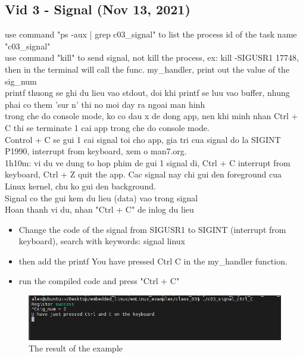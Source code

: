 \documentclass{article}
\begin{document}
\subsection{Vid 3 - Signal (Nov 13, 2021)}

use command "ps -aux | grep c03\_signal" to list the process id of the task name "c03\_signal"
\\use command "kill" to send signal, not kill the process, ex: kill -SIGUSR1 17748, then in the terminal will call the func. my\_handler, print out the value of the sig\_num
\\printf thuong se ghi du lieu vao stdout, doi khi printf se luu vao buffer, nhung phai co them 'sur n' thi no moi day ra ngoai man hinh 
\\trong che do console mode, ko co dau x de dong app, nen khi minh nhan Ctrl + C thi se terminate 1 cai app trong che do console mode.
\\Control + C se gui 1 cai signal toi cho app, gia tri cua signal do la SIGINT P1990, interrupt from keyboard, xem o man7.org.
\\1h10m: vi du ve dung to hop phim de gui 1 signal di, Ctrl + C interrupt from keyboard, Ctrl + Z quit the app. Cac signal nay chi gui den foreground cua Linux kernel, chu ko gui den background.
\\Signal co the gui kem du lieu (data) vao trong signal
\\Hoan thanh vi du, nhan "Ctrl + C" de inlog du lieu
\begin{itemize}
  \item Change the code of the signal from SIGUSR1 to SIGINT (interrupt from keyboard), search with keywords: signal linux
  \item then add the printf You have pressed Ctrl C in the my\_handler function.
  \item run the compiled code and press "Ctrl + C"
\end{itemize}

\begin{figure}[h]
  \includegraphics[scale=0.5]{emLinux_c03_signal_ctrl_C}
  \caption{The result of the example}  
\end{figure}
\end{document}
